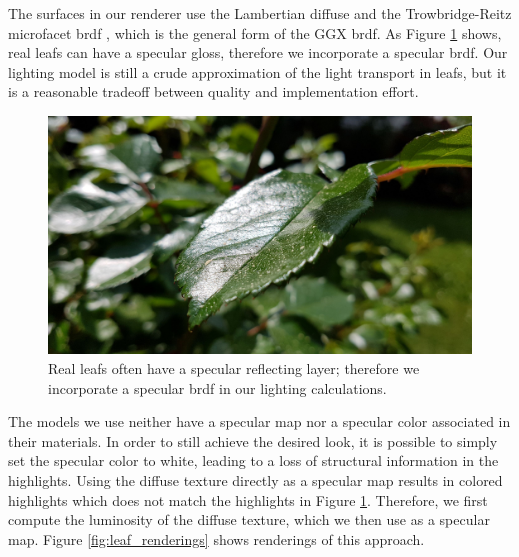 The surfaces in our renderer use the Lambertian diffuse \cite{lambert} and the Trowbridge-Reitz microfacet \ac{brdf} \cite{trowbridge_reitz}, which is the general form of the GGX \ac{brdf}.
As Figure \ref{fig:leaf_gloss} shows, real leafs can have a specular gloss, therefore we incorporate a specular \ac{brdf}.
Our lighting model is still a crude approximation of the light transport in leafs, but it is a reasonable tradeoff between quality and implementation effort.
\begin{figure}[t]
    \centering
    \includegraphics[width=0.5\linewidth]{img/leaf_gloss.jpg}
    \caption[Leaf with glossy surface]{Real leafs often have a specular reflecting layer; therefore we incorporate a specular \ac{brdf} in our lighting calculations.}
    \label{fig:leaf_gloss}
\end{figure} 
The models we use neither have a specular map nor a specular color associated in their materials.
In order to still achieve the desired look, it is possible to simply set the specular color to white, leading to a loss of structural information in the highlights.
Using the diffuse texture directly as a specular map results in colored highlights which does not match the highlights in Figure \ref{fig:leaf_gloss}.
Therefore, we first compute the luminosity of the diffuse texture, which we then use as a specular map.
Figure \ref{fig:leaf_renderings} shows renderings of this approach.
